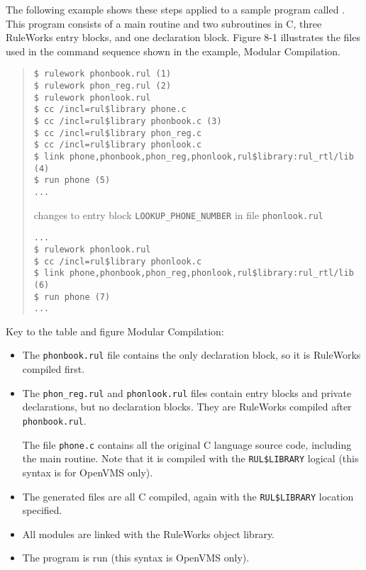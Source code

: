The following example shows these steps applied to a sample program
called . This program consists of a main routine and two
subroutines in C, three RuleWorks entry blocks, and one declaration
block. Figure 8-1 illustrates the files used in the command sequence
shown in the example, Modular Compilation.

\begin{quote}
\begin{verbatim}
$ rulework phonbook.rul (1)
$ rulework phon_reg.rul (2)
$ rulework phonlook.rul
$ cc /incl=rul$library phone.c
$ cc /incl=rul$library phonbook.c (3)
$ cc /incl=rul$library phon_reg.c
$ cc /incl=rul$library phonlook.c
$ link phone,phonbook,phon_reg,phonlook,rul$library:rul_rtl/lib (4)
$ run phone (5)
...
\end{verbatim}

changes to entry block \verb|LOOKUP_PHONE_NUMBER| in file
\verb|phonlook.rul|

\begin{verbatim}
...
$ rulework phonlook.rul
$ cc /incl=rul$library phonlook.c
$ link phone,phonbook,phon_reg,phonlook,rul$library:rul_rtl/lib (6)
$ run phone (7)
...
\end{verbatim}
\end{quote}
Key to the table and figure Modular Compilation:
\begin{itemize}
\item[\co{(1)}] The \verb|phonbook.rul| file contains the only
  declaration block, so it is RuleWorks compiled first.

\item[\co{(2)}] The \verb|phon_reg.rul| and \verb|phonlook.rul| files
  contain entry blocks and private declarations, but no declaration
  blocks. They are RuleWorks compiled after \verb|phonbook.rul|.

  The file \verb|phone.c| contains all the original C language source
  code, including the main routine. Note that it is compiled with the
  \verb|RUL$LIBRARY| logical (this syntax is for OpenVMS only).

\item[\co{(3)}] The generated files are all C compiled, again with the
  \verb|RUL$LIBRARY| location specified.

\item[\co{(4)}] All modules are linked with the RuleWorks object
  library.

\item[\co{(5)}] The program is run (this syntax is OpenVMS only).
\end{itemize}

